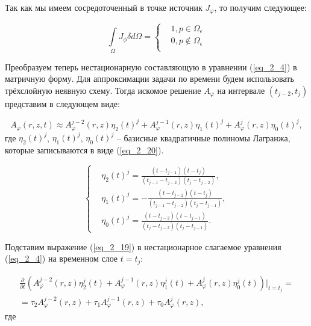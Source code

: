 Так как мы имеем сосредоточенный в точке источник $J_{\varphi}$, то получим следующее:

\begin{equation} \label{eq_2_18}
	\int \limits_{\Omega} J_{\phi} \delta d \Omega = 
	\left \{ \begin{aligned}
		& 1, p \in \Omega_{\epsilon}\\
		& 0,    p \notin \Omega_{\epsilon}\\
	\end{aligned} \right.
\end{equation}

Преобразуем теперь нестационарную составляющую в уравнении (\ref{eq_2_4}) в матричную форму. Для аппроксимации задачи по времени будем использовать трёхслойную неявную схему. Тогда искомое решение $A_{\varphi}$ на интервале $(t_{j-2}, t_j)$ представим в следующем виде:

\begin{equation} \label{eq_2_19}
	A_{\varphi}(r, z, t) \approx A_{\varphi}^{j - 2}(r, z) \eta_2(t)^j + A_{\varphi}^{j - 1}(r, z) \eta_1(t)^j + A_{\varphi}^{j}(r, z) \eta_0(t)^j,
\end{equation}
где $\eta_2(t)^j$, $\eta_1(t)^j$, $\eta_0(t)^j$ -- базисные квадратичные полиномы Лагранжа, которые записываются в виде (\ref{eq_2_20}).

\begin{equation} \label{eq_2_20}
	\begin{cases}
		& \eta_2(t)^j = \frac{(t-t_{j-1})(t - t_j)}{(t_{j-1} - t_{j-2}) (t_j - t_{j-2})}, \\
		& \eta_1(t)^j = -\frac{(t-t_{j-2})(t - t_j)}{(t_{j-1} - t_{j-2}) (t_j - t_{j-1})}, \\
		& \eta_0(t)^j = \frac{(t-t_{j-2})(t - t_{j - 1})}{(t_{j} - t_{j-2}) (t_j - t_{j-1})}.
	\end{cases}
\end{equation}

Подставим выражение (\ref{eq_2_19}) в нестационарное слагаемое уравнения (\ref{eq_2_4}) на временном слое $t=t_j$:

\begin{equation} \label{eq_2_23}
\begin{gathered}
	\frac{\partial}{\partial t} \left(A_{\varphi}^{j - 2}(r, z) \eta_2^j(t) + A_{\varphi}^{j - 1}(r, z) \eta_1^j(t) + A_{\varphi}^{j}(r, z) \eta_0^j(t)\right) |_{t=t_j} = \\ = \tau_2 A_{\varphi}^{j - 2}(r, z) + \tau_1 A_{\varphi}^{j - 1}(r, z) +\tau_0 A_{\varphi}^{j}(r, z),
\end{gathered}
\end{equation}
где

